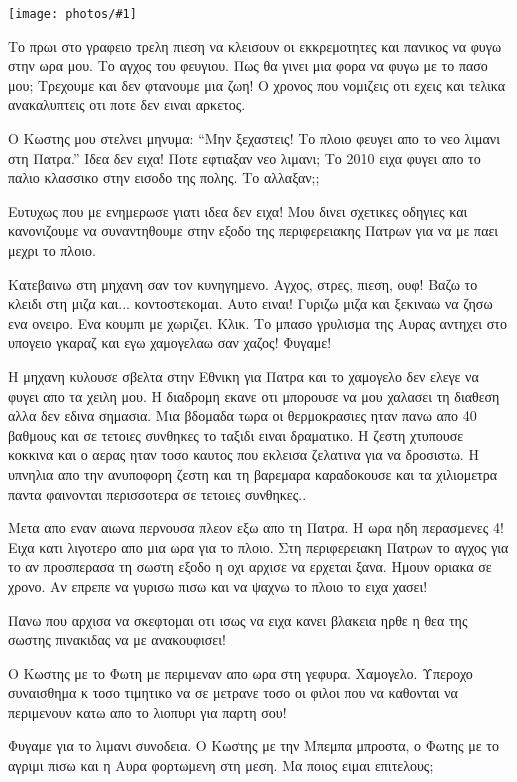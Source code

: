 \documentclass[11pt, letterpaper]{book}
\newcommand\photo[1]{\noindent\texttt{[image: photos/\#1]}}
\begin{document}
\photo{2.jpg}

Το πρωι στο γραφειο τρελη πιεση να κλεισουν οι εκκρεμοτητες και πανικος να φυγω στην ωρα μου. 
Το αγχος του φευγιου. Πως θα γινει μια φορα να φυγω με το πασο μου; Τρεχουμε και δεν φτανουμε μια ζωη! 
Ο χρονος που νομιζεις οτι εχεις και τελικα ανακαλυπτεις οτι ποτε δεν ειναι αρκετος.

Ο Κωστης μου στελνει μηνυμα: ``Μην ξεχαστεις! Το πλοιο φευγει απο το νεο λιμανι στη Πατρα.'' Ιδεα δεν ειχα! Ποτε εφτιαξαν νεο λιμανι; Το 2010 ειχα φυγει απο το παλιο κλασσικο στην εισοδο της πολης. Το αλλαξαν;; 

Ευτυχως που με ενημερωσε γιατι ιδεα δεν ειχα! Μου δινει σχετικες οδηγιες και κανονιζουμε να συναντηθουμε στην εξοδο της περιφερειακης Πατρων για να με παει μεχρι το πλοιο. 

Κατεβαινω στη μηχανη σαν τον κυνηγημενο. Αγχος, στρες, πιεση, ουφ! Βαζω το κλειδι στη μιζα και... κοντοστεκομαι. Αυτο ειναι! Γυριζω μιζα και ξεκιναω να ζησω ενα ονειρο. Ενα κουμπι με χωριζει. Κλικ. Το μπασο γρυλισμα της Αυρας αντηχει στο υπογειο γκαραζ και εγω χαμογελαω σαν χαζος! Φυγαμε!

Η μηχανη κυλουσε σβελτα στην Εθνικη για Πατρα και το χαμογελο δεν ελεγε να φυγει απο τα χειλη μου. Η διαδρομη εκανε οτι μπορουσε να μου χαλασει τη διαθεση αλλα δεν εδινα σημασια. Μια βδομαδα τωρα οι θερμοκρασιες ηταν πανω απο 40 βαθμους και σε τετοιες συνθηκες το ταξιδι ειναι δραματικο. Η ζεστη χτυπουσε κοκκινα και ο αερας ηταν τοσο καυτος που εκλεισα ζελατινα για να δροσιστω.  Η υπνηλια απο την ανυποφορη ζεστη και τη βαρεμαρα καραδοκουσε και τα χιλιομετρα παντα φαινονται περισσοτερα σε τετοιες συνθηκες..

Μετα απο εναν αιωνα περνουσα πλεον εξω απο τη Πατρα. Η ωρα ηδη περασμενες 4! Ειχα κατι λιγοτερο απο μια ωρα για το πλοιο.  Στη περιφερειακη Πατρων το αγχος για το αν προσπερασα τη σωστη εξοδο η οχι αρχισε να ερχεται ξανα. Ημουν οριακα σε χρονο. Αν επρεπε να γυρισω πισω και να ψαχνω το πλοιο το ειχα χασει!

Πανω που αρχισα να σκεφτομαι οτι ισως να ειχα κανει βλακεια ηρθε η θεα της σωστης πινακιδας να με ανακουφισει!

Ο Κωστης με το Φωτη με περιμεναν απο ωρα στη γεφυρα. Χαμογελο. Υπεροχο συναισθημα κ τοσο τιμητικο να σε μετρανε τοσο οι φιλοι που να καθονται να περιμενουν κατω απο το λιοπυρι για παρτη σου! 

Φυγαμε για το λιμανι συνοδεια. Ο Κωστης με την Μπεμπα μπροστα, ο Φωτης με το αγριμι πισω και η Αυρα φορτωμενη στη μεση. Μα ποιος ειμαι επιτελους; 
\end{document}
